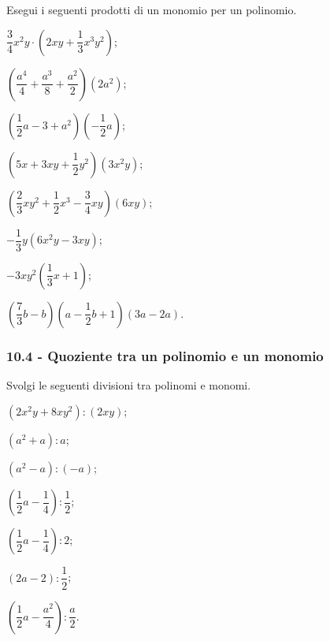 \begin{esercizio}
\label{ese:10.16}
 Esegui i seguenti prodotti di un monomio per un polinomio.
 \begin{multicols}{2}
\begin{enumeratea}
 \item $\dfrac{3}{4}x^{2}y\cdot\left(2{xy}+\dfrac{1}{3}x^{3}y^{2}\right)$;
 \item $\left(\dfrac{a^{4}}{4}+\dfrac{a^{3}}{8}+\dfrac{a^{2}}{2}\right)\left(2a^{2}\right)$;
 \item $\left(\dfrac{1}{2}a-3+a^{2}\right)\left(-{\dfrac{1}{2}}a\right)$;
 \item $\left(5x+3{xy}+\dfrac{1}{2}y^{2}\right)\left(3x^{2}y\right)$;
 \item $\left(\dfrac{2}{3}xy^{2}+\dfrac{1}{2}x^{3}-\dfrac{3}{4}{xy}\right)(6{xy})$;
 \item $-\dfrac{1}{3}y\left(6x^{2}y-3{xy}\right)$;
 \item $-3xy^2\left(\dfrac{1}{3}x+1\right)$;
 \item $\left(\dfrac{7}{3}b-b\right)\left(a-\dfrac{1}{2}b+1\right)(3a-2a)$.
\end{enumeratea}
\end{multicols}
\end{esercizio}
\subsubsection*{10.4 - Quoziente tra un polinomio e un monomio}
\begin{esercizio}
\label{ese:10.17}
 Svolgi le seguenti divisioni tra polinomi e monomi.
 \begin{multicols}{2}
\begin{enumeratea}
 \item $\left(2x^{2}y+8{xy}^{2}\right):\left(2{xy}\right)$;
 \item $\left(a^{2}+a\right):a$;
 \item $\left(a^{2}-a\right):(-a)$;
 \item $\left(\dfrac{1}{2}a-\dfrac{1}{4}\right):\dfrac{1}{2}$;
 \item $\left(\dfrac{1}{2}a-\dfrac{1}{4}\right):2$;
 \item $(2a-2):\dfrac{1}{2}$;
 \item $\left(\dfrac{1}{2}a-\dfrac{a^{2}}{4}\right):\dfrac{a}{2}$.
\end{enumeratea}
\end{multicols}
\end{esercizio}

